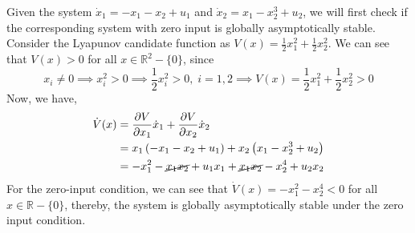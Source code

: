 Given the system \( \dot{x}_{1}=-x_{1}-x_{2}+u_{1} \) and \( \dot{x}_{2}=x_{1}-x_{2}^{3}+u_{2} \), we will first check if the corresponding system with zero input is globally asymptotically stable.
Consider the Lyapunov candidate function as \( V(x)=\frac{1}{2} x_{1}^{2}+\frac{1}{2} x_{2}^{2} \).
We can see that \( V(x) > 0 \) for all \( x \in \mathbb{R}^2 - \{ 0 \} \), since
\begin{equation*}
    x_i \neq 0
    \implies
    x_i^2 > 0
    \implies
    \frac{1}{2} x_i^2 > 0,
    \;
    i = 1, 2
    \implies
    V(x)
    =
    \frac{1}{2} x_1^2 + \frac{1}{2} x_2^2
    > 0
\end{equation*}
Now, we have,
\begin{align*}
    \dot{V}(x)
     & =
    \frac{\partial V}{\partial x_1} \dot{x}_1 + \frac{\partial V}{\partial x_2} \dot{x}_2
    \\
     & =
    x_1 \left( -x_1 - x_2 + u_1 \right) + x_2 \left( x_1 - x_2^3 + u_2 \right)
    \\
     & =
    -x_1^2 - \cancel{x_1 x_2} + u_1 x_1 + \cancel{x_1 x_2} - x_2^4 + u_2 x_2
\end{align*}
For the zero-input condition, we can see that \( \dot{V}(x) = -x_1^2 - x_2^4 < 0 \) for all \( x \in \mathbb{R} - \{ 0 \} \), thereby, the system is globally asymptotically stable under the zero input condition.
